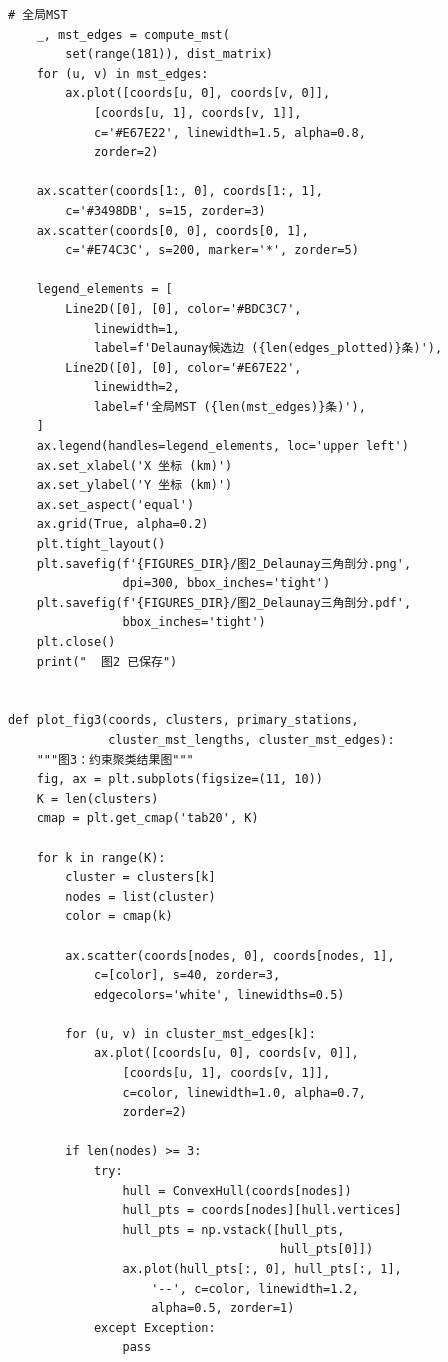 \documentclass[12pt,a4paper]{ctexart}
\theoremstyle{definition}
\theoremstyle{plain}
\theoremstyle{remark}
\begin{document}
\begin{lstlisting}[caption={\texttt{visualization.py}：论文图表生成}]
    # 全局MST
    _, mst_edges = compute_mst(
        set(range(181)), dist_matrix)
    for (u, v) in mst_edges:
        ax.plot([coords[u, 0], coords[v, 0]],
            [coords[u, 1], coords[v, 1]],
            c='#E67E22', linewidth=1.5, alpha=0.8,
            zorder=2)

    ax.scatter(coords[1:, 0], coords[1:, 1],
        c='#3498DB', s=15, zorder=3)
    ax.scatter(coords[0, 0], coords[0, 1],
        c='#E74C3C', s=200, marker='*', zorder=5)

    legend_elements = [
        Line2D([0], [0], color='#BDC3C7',
            linewidth=1,
            label=f'Delaunay候选边 ({len(edges_plotted)}条)'),
        Line2D([0], [0], color='#E67E22',
            linewidth=2,
            label=f'全局MST ({len(mst_edges)}条)'),
    ]
    ax.legend(handles=legend_elements, loc='upper left')
    ax.set_xlabel('X 坐标 (km)')
    ax.set_ylabel('Y 坐标 (km)')
    ax.set_aspect('equal')
    ax.grid(True, alpha=0.2)
    plt.tight_layout()
    plt.savefig(f'{FIGURES_DIR}/图2_Delaunay三角剖分.png',
                dpi=300, bbox_inches='tight')
    plt.savefig(f'{FIGURES_DIR}/图2_Delaunay三角剖分.pdf',
                bbox_inches='tight')
    plt.close()
    print("  图2 已保存")


def plot_fig3(coords, clusters, primary_stations,
              cluster_mst_lengths, cluster_mst_edges):
    """图3：约束聚类结果图"""
    fig, ax = plt.subplots(figsize=(11, 10))
    K = len(clusters)
    cmap = plt.get_cmap('tab20', K)

    for k in range(K):
        cluster = clusters[k]
        nodes = list(cluster)
        color = cmap(k)

        ax.scatter(coords[nodes, 0], coords[nodes, 1],
            c=[color], s=40, zorder=3,
            edgecolors='white', linewidths=0.5)

        for (u, v) in cluster_mst_edges[k]:
            ax.plot([coords[u, 0], coords[v, 0]],
                [coords[u, 1], coords[v, 1]],
                c=color, linewidth=1.0, alpha=0.7,
                zorder=2)

        if len(nodes) >= 3:
            try:
                hull = ConvexHull(coords[nodes])
                hull_pts = coords[nodes][hull.vertices]
                hull_pts = np.vstack([hull_pts,
                                      hull_pts[0]])
                ax.plot(hull_pts[:, 0], hull_pts[:, 1],
                    '--', c=color, linewidth=1.2,
                    alpha=0.5, zorder=1)
            except Exception:
                pass


\end{lstlisting}
\end{document}

